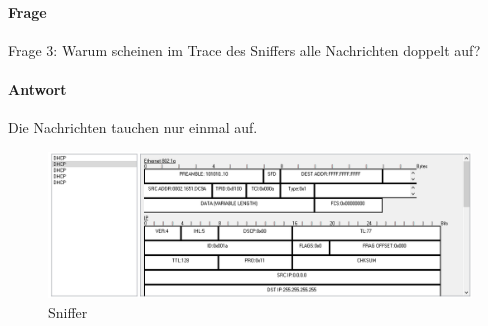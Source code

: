 \paragraph{Frage}
Frage 3: Warum scheinen im Trace des Sniffers alle Nachrichten doppelt auf?
\paragraph{Antwort}
Die Nachrichten tauchen nur einmal auf.
\begin{figure}[!htb]
    \centering
    \includegraphics[width=\textwidth,height=.85\textwidth,keepaspectratio]{./img/dhcp_ein.png}
    \caption{Sniffer}
\end{figure}